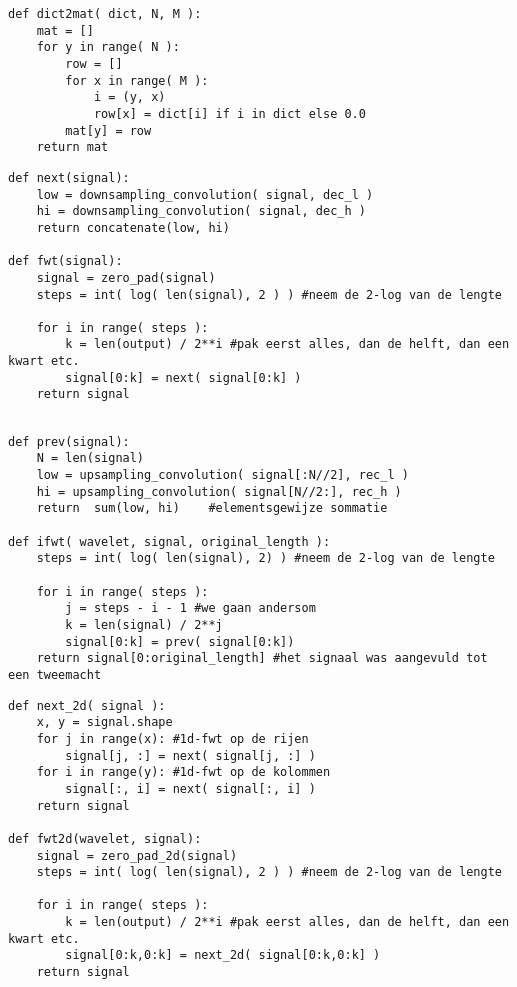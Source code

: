 \begin{lstlisting}[label=dict2mat,float=h!,caption=Dictionary naar matrix conversie]
def dict2mat( dict, N, M ):
	mat = []
	for y in range( N ):
		row = []
		for x in range( M ):
			i = (y, x)
			row[x] = dict[i] if i in dict else 0.0
		mat[y] = row
	return mat
\end{lstlisting}

\begin{lstlisting}[label=next,float=h!,caption=De FWT]
def next(signal):
	low = downsampling_convolution( signal, dec_l )
	hi = downsampling_convolution( signal, dec_h )
	return concatenate(low, hi)
	
def fwt(signal):
	signal = zero_pad(signal)
	steps = int( log( len(signal), 2 ) ) #neem de 2-log van de lengte
	
	for i in range( steps ):
		k = len(output) / 2**i #pak eerst alles, dan de helft, dan een kwart etc.
		signal[0:k] = next( signal[0:k] )
	return signal
	
\end{lstlisting}

\begin{lstlisting}[label=prev,float=h!,caption=De iFWT]
def prev(signal):
	N = len(signal)
	low = upsampling_convolution( signal[:N//2], rec_l )
	hi = upsampling_convolution( signal[N//2:], rec_h )
	return  sum(low, hi) 	#elementsgewijze sommatie
	
def ifwt( wavelet, signal, original_length ):
	steps = int( log( len(signal), 2) ) #neem de 2-log van de lengte
	
	for i in range( steps ):
		j = steps - i - 1 #we gaan andersom
		k = len(signal) / 2**j
		signal[0:k] = prev( signal[0:k])
	return signal[0:original_length] #het signaal was aangevuld tot een tweemacht
\end{lstlisting}

\begin{lstlisting}[label=fwt2d,float=h!,caption=De Mallatdecompositie in 2 dimensies]
def next_2d( signal ):
	x, y = signal.shape
	for j in range(x): #1d-fwt op de rijen
		signal[j, :] = next( signal[j, :] )
	for i in range(y): #1d-fwt op de kolommen
		signal[:, i] = next( signal[:, i] )
	return signal

def fwt2d(wavelet, signal):
	signal = zero_pad_2d(signal)
	steps = int( log( len(signal), 2 ) ) #neem de 2-log van de lengte
	
	for i in range( steps ):
		k = len(output) / 2**i #pak eerst alles, dan de helft, dan een kwart etc.
		signal[0:k,0:k] = next_2d( signal[0:k,0:k] )
	return signal
\end{lstlisting}

